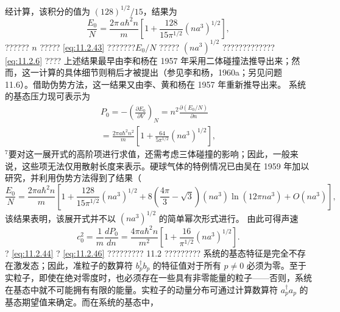 经计算，该积分的值为 \((128)^{1/2}/15\)，结果为
\begin{equation}\tag{11.2.43}\label{eq:11.2.43}
\frac { E _ { 0 } } { N } = \frac { 2 \pi \, a \hbar ^{2} n } { m } \left[ 1 + \frac { 12 8 } { 15 \pi ^{1 / 2} } ( n a ^{3} ) ^{1 / 2} \right] ,
\end{equation}
?????? \(n\) ????? \autoref{eq:11.2.43} ???????\(E_{0}/N\) ????? \((na^{3})^{1/2}\) ????????????? \autoref{eq:11.2.6} ????
上述结果最早由李和杨在 1957 年采用二体碰撞法推导出来；然而，这一计算的具体细节则稍后才被提出（参见李和杨，1960a；另见问题 11.6）。借助伪势方法，这一结果又由李、黄和杨在 1957 年重新推导出来。
系统的基态压力现可表示为
\begin{equation}\tag{11.2.44}\label{eq:11.2.44}
\begin{array}{r} { P _ { 0 } = - \left( \frac { \partial E _ { 0 } } { \partial V } \right) _ { N } = n ^{2} \frac { \partial ( E _ { 0 } / N ) } { \partial n } } \\{ = \frac { 2 \pi a \hbar ^{2} n ^{2} } { m } \left[ 1 + \frac { 64 } { 5 \pi ^{1 / 2} } ( n a ^{3} ) ^{1 / 2} \right] , } \end{array}
\end{equation}
\(^{7}\)要对这一展开式的高阶项进行求值，还需考虑三体碰撞的影响；因此，一般来说，这些项无法仅用散射长度来表示。硬球气体的特例情况已由吴在 1959 年加以研究，并利用伪势方法得到了结果（
\begin{equation}\tag{11.2.45}\label{eq:11.2.45}
\frac { E _ { 0 } } { N } = \frac { 2 \pi a \hbar ^{2} n } { m } \left[ 1 + \frac { 12 8 } { 15 \pi ^{1 / 2} } \left( n a ^{3} \right) ^{1 / 2} + 8 \left( \frac { 4 \pi } { 3 } - \sqrt { 3 } \right) \left( n a ^{3} \right) \ln ( 12 \pi n a ^{3} ) + O ( n a ^{3} ) \right] ,
\end{equation}
该结果表明，该展开式并不以 \((na^{3})^{1/2}\) 的简单幂次形式进行。
由此可得声速
\begin{equation}\tag{11.2.46}\label{eq:11.2.46}
c _ { 0 } ^{2} = \frac { 1 } { m } \frac { d P _ { 0 } } { d n } = \frac { 4 \pi a \hbar ^{2} n } { m ^{2} } \left[ 1 + \frac { 16 } { \pi ^{1 / 2} } ( n a ^{3} ) ^{1 / 2} \right] .
\end{equation}
? \autoref{eq:11.2.44} ? \autoref{eq:11.2.46} ????????? 11.2 ?????????
系统的基态特征是完全不存在激发态；因此，准粒子的数算符 \(b_{p}^{\dagger}b_{p}\) 的特征值对于所有 \(p\neq0\) 必须为零。至于实粒子，即使在绝对零度时，也必须存在一些具有非零能量的粒子——否则，系统在基态中就不可能拥有有限的能量。实粒子的动量分布可通过计算数算符 \(a_{p}^{\dagger}a_{p}\) 的基态期望值来确定。而在系统的基态中，
